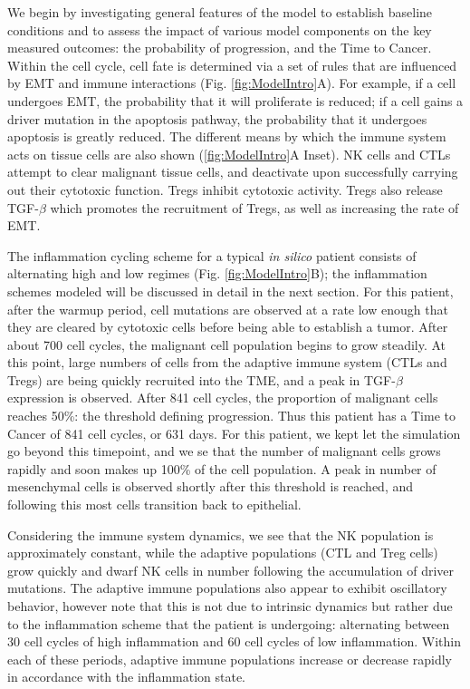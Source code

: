 \documentclass[11pt]{article}
\begin{document}
We begin by investigating general features of the model to establish baseline conditions and to assess the impact of various model components on the key measured outcomes: the probability of progression, and the Time to Cancer. 
Within the cell cycle, cell fate is determined via a set of rules that are influenced by EMT and immune interactions (Fig. \ref{fig:ModelIntro}A). For example, if a cell undergoes EMT, the probability that it will proliferate is reduced; if a cell gains a driver mutation in the apoptosis pathway, the probability that it undergoes apoptosis is greatly reduced.
The different means by which the immune system acts on tissue cells are also shown (\ref{fig:ModelIntro}A Inset). NK cells and CTLs attempt to clear malignant tissue cells, and deactivate upon successfully carrying out their cytotoxic function.
Tregs inhibit cytotoxic activity.
Tregs also release TGF-$\beta$ which promotes the recruitment of Tregs, as well as increasing the rate of EMT.
\par
The inflammation cycling scheme for a typical {\it in silico} patient consists of alternating high and low regimes (Fig. \ref{fig:ModelIntro}B); the inflammation schemes modeled will be discussed in detail in the next section.
For this patient, after the warmup period, cell mutations are observed at a rate low enough that they are cleared by cytotoxic cells before being able to establish a tumor.
After about 700 cell cycles, the malignant cell population begins to grow steadily.
At this point, large numbers of cells from the adaptive immune system (CTLs and Tregs) are being quickly recruited into the TME, and a peak in TGF-$\beta$ expression is observed.
After 841 cell cycles, the proportion of malignant cells reaches 50\%: the threshold defining progression.
Thus this patient has a Time to Cancer of 841 cell cycles, or 631 days.
For this patient, we kept let the simulation go beyond this timepoint, and we se that the number of malignant cells grows rapidly and soon makes up 100\% of the cell population.
A peak in number of mesenchymal cells is observed shortly after this threshold is reached, and following this most cells transition back to epithelial.
\par 
Considering the immune system dynamics, we see that the NK population is approximately constant, while the adaptive populations (CTL and Treg cells) grow quickly and dwarf NK cells in number following the accumulation of driver mutations.
The adaptive immune populations also appear to exhibit oscillatory behavior, however note that this is not due to intrinsic dynamics but rather due to the inflammation scheme that the patient is undergoing: alternating between 30 cell cycles of high inflammation and 60 cell cycles of low inflammation. Within each of these periods, adaptive immune populations increase or decrease rapidly in accordance with the inflammation state.
\end{document}

